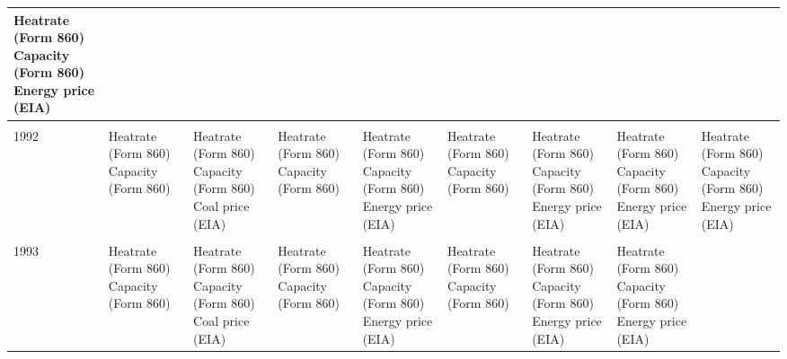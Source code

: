 \documentclass[10pt]{report}
\begin{document}
\begin{scriptsize}
\begin{landscape}
\begin{center}
\begin{longtable}{|lllllllll|}
\shortstack{Heatrate (Form 860) \\ Capacity (Form 860) \\ Energy price (EIA)} \\
\hline \\
1992 & \shortstack{Heatrate (Form 860) \\ Capacity (Form 860)}  &
\shortstack{Heatrate (Form 860) \\ Capacity (Form 860) \\ Coal price (EIA)} &
\shortstack{Heatrate (Form 860) \\ Capacity (Form 860)} &
\shortstack{Heatrate (Form 860) \\ Capacity (Form 860) \\ Energy price (EIA)} &
\shortstack{Heatrate (Form 860) \\ Capacity (Form 860)} &
\shortstack{Heatrate (Form 860) \\ Capacity (Form 860) \\ Energy price (EIA)} &
\shortstack{Heatrate (Form 860) \\ Capacity (Form 860) \\ Energy price (EIA)} &
\shortstack{Heatrate (Form 860) \\ Capacity (Form 860) \\ Energy price (EIA)}\\
\hline \\
1993 & \shortstack{Heatrate (Form 860) \\ Capacity (Form 860)}  &
\shortstack{Heatrate (Form 860) \\ Capacity (Form 860) \\ Coal price (EIA)} &
\shortstack{Heatrate (Form 860) \\ Capacity (Form 860)} &
\shortstack{Heatrate (Form 860) \\ Capacity (Form 860) \\ Energy price (EIA)} &
\shortstack{Heatrate (Form 860) \\ Capacity (Form 860)} &
\shortstack{Heatrate (Form 860) \\ Capacity (Form 860) \\ Energy price (EIA)} &
\shortstack{Heatrate (Form 860) \\ Capacity (Form 860) \\ Energy price (EIA)} &

\end{longtable}
\end{center}
\end{landscape}
\end{scriptsize}
\end{document}
